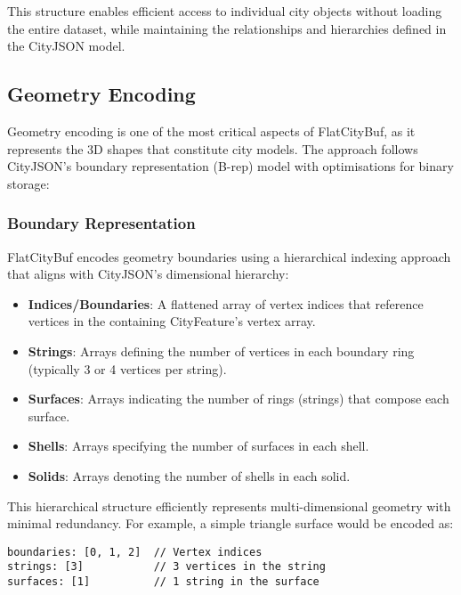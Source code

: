 This structure enables efficient access to individual city objects without loading the entire dataset, while maintaining the relationships and hierarchies defined in the CityJSON model.

\subsection{Geometry Encoding}
\label{subsec:geometry_encoding}

Geometry encoding is one of the most critical aspects of FlatCityBuf, as it represents the 3D shapes that constitute city models. The approach follows CityJSON's boundary representation (B-rep) model with optimisations for binary storage:

\subsubsection{Boundary Representation}
\label{subsubsec:boundary_representation}

FlatCityBuf encodes geometry boundaries using a hierarchical indexing approach that aligns with CityJSON's dimensional hierarchy:

\begin{itemize}
    \item \textbf{Indices/Boundaries}: A flattened array of vertex indices that reference vertices in the containing CityFeature's vertex array.
    \item \textbf{Strings}: Arrays defining the number of vertices in each boundary ring (typically 3 or 4 vertices per string).
    \item \textbf{Surfaces}: Arrays indicating the number of rings (strings) that compose each surface.
    \item \textbf{Shells}: Arrays specifying the number of surfaces in each shell.
    \item \textbf{Solids}: Arrays denoting the number of shells in each solid.
\end{itemize}

This hierarchical structure efficiently represents multi-dimensional geometry with minimal redundancy. For example, a simple triangle surface would be encoded as:

\begin{verbatim}
boundaries: [0, 1, 2]  // Vertex indices
strings: [3]           // 3 vertices in the string
surfaces: [1]          // 1 string in the surface
\end{verbatim}

